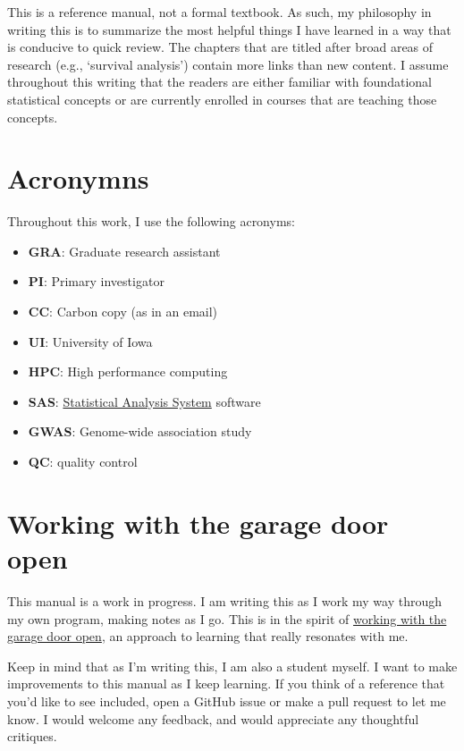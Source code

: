 \documentclass[
]{book}
\providecommand{\tightlist}{%
  \setlength{\itemsep}{0pt}\setlength{\parskip}{0pt}}
\begin{document}
This is a reference manual, not a formal textbook. As such, my philosophy in writing this is to summarize the most helpful things I have learned in a way that is conducive to quick review. The chapters that are titled after broad areas of research (e.g., `survival analysis') contain more links than new content. I assume throughout this writing that the readers are either familiar with foundational statistical concepts or are currently enrolled in courses that are teaching those concepts.

\hypertarget{acronyms}{%
\section{Acronymns}\label{acronyms}}

Throughout this work, I use the following acronyms:

\begin{itemize}
\tightlist
\item
  \textbf{GRA}: Graduate research assistant
\item
  \textbf{PI}: Primary investigator
\item
  \textbf{CC}: Carbon copy (as in an email)
\item
  \textbf{UI}: University of Iowa
\item
  \textbf{HPC}: High performance computing
\item
  \textbf{SAS}: \href{https://en.wikipedia.org/wiki/SAS_(software)}{Statistical Analysis System} software
\item
  \textbf{GWAS}: Genome-wide association study
\item
  \textbf{QC}: quality control
\end{itemize}

\hypertarget{working-with-the-garage-door-open}{%
\section{Working with the garage door open}\label{working-with-the-garage-door-open}}

This manual is a work in progress. I am writing this as I work my way through my own program, making notes as I go. This is in the spirit of \href{https://notes.andymatuschak.org/About_these_notes?stackedNotes=z21cgR9K3UcQ5a7yPsj2RUim3oM2TzdBByZu}{working with the garage door open}, an approach to learning that really resonates with me.

Keep in mind that as I'm writing this, I am also a student myself. I want to make improvements to this manual as I keep learning. If you think of a reference that you'd like to see included, open a GitHub issue or make a pull request to let me know. I would welcome any feedback, and would appreciate any thoughtful critiques.
\end{document}
